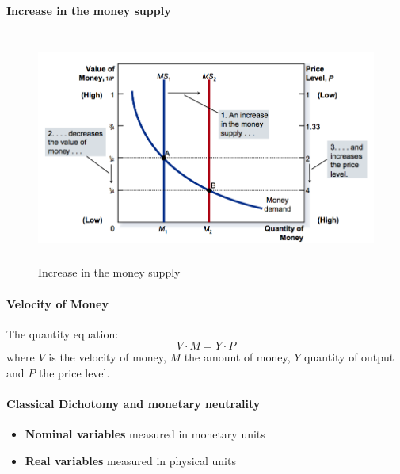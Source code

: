 \documentclass[a4paper,titlepage] {scrartcl}
\begin{document}
\paragraph{Increase in the money supply} %
\label{par:increase_in_the_money_supply}
\begin{figure}[htbp]
	\centering
		\includegraphics[height=3in]{images/moneysupply.png}
	\caption{Increase in the money supply}
	\label{fig:images_moneysupply}
\end{figure}



\paragraph{Velocity of Money} %
\label{par:velocity_of_money}
The quantity equation:
\begin{equation}
	V\cdot M = Y \cdot P
\end{equation}
where $V$ is the velocity of money, $M$ the amount of money, $Y$ quantity of output and $P$ the price level.



\paragraph{Classical Dichotomy and monetary neutrality} %
\label{par:classical_dichotomy_and_monetary_neutrality}
\begin{itemize}
	\item \textbf{Nominal variables} measured in monetary units
	\item \textbf{Real variables} measured in physical units
\end{itemize}
\end{document}
